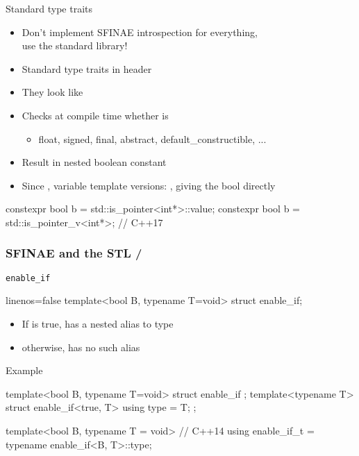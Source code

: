 \begin{frame}[fragile]
  \begin{block}{Standard type traits}
    \begin{itemize}
    \item Don't implement SFINAE introspection for everything,\\
          use the standard library!
    \item Standard type traits in header 
    \item They look like 
    \item Checks at compile time whether  is
    \begin{itemize}
      \item float, signed, final, abstract, default\_constructible, ...
    \end{itemize}
    \item Result in nested boolean constant 
    \item Since , variable template versions: , giving the bool directly
    \end{itemize}
  \end{block}
  \begin{cppcode*}{}
    constexpr bool b = std::is_pointer<int*>::value;
    constexpr bool b = std::is_pointer_v<int*>; // C++17
  \end{cppcode*}
\end{frame}

\begin{frame}[fragile]
  \frametitle{SFINAE and the STL \hfill {}/}
  \begin{block}{\texttt{enable\_if} }
    \begin{cppcode*}{linenos=false}
      template<bool B, typename T=void>
      struct enable_if;
    \end{cppcode*}
    \begin{itemize}
    \item If  is true, has a nested alias  to type 
    \item otherwise, has no such alias
    \end{itemize}
  \end{block}
  \begin{exampleblock}{Example}
    \begin{cppcode*}{}
      template<bool B, typename T=void>
      struct enable_if {};
      template<typename T>
      struct enable_if<true, T> { using type = T; };

      template<bool B, typename T = void> // C++14
      using enable_if_t = typename enable_if<B, T>::type;
    \end{cppcode*}
  \end{exampleblock}
\end{frame}

